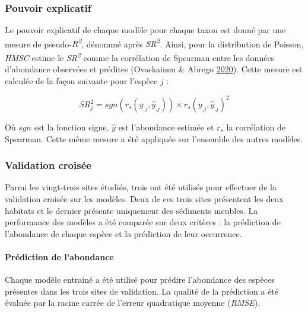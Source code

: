 \documentclass[12pt,]{article}
\begin{document}
\hypertarget{pouvoir-explicatif}{%
\subsubsection{Pouvoir explicatif}\label{pouvoir-explicatif}}

Le pouvoir explicatif de chaque modèle pour chaque taxon est donné par
une mesure de pseudo-\emph{R\textsuperscript{2}}, dénommé après
\emph{SR\textsuperscript{2}}. Ainsi, pour la distribution de Poisson,
\emph{HMSC} estime le \emph{SR\textsuperscript{2}} comme la corrélation
de Spearman entre les données d'abondance observées et prédites
(Ovaskainen \& Abrego \protect\hyperlink{ref-Ovaskainen_2020}{2020}).
Cette mesure est calculée de la façon suivante pour l'espèce \(j\) :

\begin{equation} SR^2_j = sgn\left(r_s\left(y_{.j}, \hat{y}_{.j}\right)\right) \times r_s\left(y_{.j}, \hat{y}_{.j}\right)^2 \label{eq:eq2}\end{equation}

Où \(sgn\) est la fonction signe, \(\hat{y}\) est l'abondance estimée et
\(r_s\) la corrélation de Spearman. Cette même mesure a été appliquée
sur l'ensemble des autres modèles.

\hypertarget{validation-croisuxe9e}{%
\subsubsection{Validation croisée}\label{validation-croisuxe9e}}

Parmi les vingt-trois sites étudiés, trois ont été utilisés pour
effectuer de la validation croisée sur les modèles. Deux de ces trois
sites présentent les deux habitats et le dernier présente uniquement des
sédiments meubles. La performance des modèles a été comparée sur deux
critères : la prédiction de l'abondance de chaque espèce et la
prédiction de leur occurrence.

\hypertarget{pruxe9diction-de-labondance}{%
\paragraph{Prédiction de
l'abondance}\label{pruxe9diction-de-labondance}}

Chaque modèle entrainé a été utilisé pour prédire l'abondance des
espèces présentes dans les trois sites de validation. La qualité de la
prédiction a été évaluée par la racine carrée de l'erreur quadratique
moyenne (\emph{RMSE}).
\end{document}
